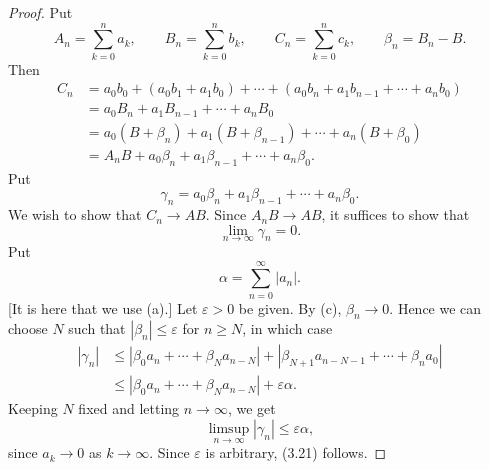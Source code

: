 \begin{proof}
Put
\[ A_n = \sum_{k=0}^{n} a_k, \qquad B_n = \sum_{k=0}^{n} b_k, \qquad
   C_n = \sum_{k=0}^{n} c_k, \qquad \beta_n = B_n - B. \]
Then
\begin{align*}
  C_n &= a_0b_0 + (a_0b_1+a_1b_0) + \cdots + (a_0b_n+a_1b_{n-1}+\cdots+a_nb_0)\\
      &= a_0B_n + a_1B_{n-1} + \cdots + a_nB_0\\
      &= a_0(B+\beta_n) + a_1(B+\beta_{n-1}) + \cdots + a_n(B+\beta_0)\\
      &= A_nB + a_0\beta_n + a_1\beta_{n-1} + \cdots + a_n\beta_0.
\end{align*}
Put
\[ \gamma_n = a_0\beta_n + a_1\beta_{n-1} + \cdots + a_n\beta_0. \]
We wish to show that $C_n \to AB$. Since $A_nB \to AB$, it suffices to show
that
\begin{equation}
  \lim_{n\to\infty} \gamma_n = 0. \tag{3.21}
\end{equation}
Put
\[ \alpha = \sum_{n=0}^{\infty} |a_n|. \]
[It is here that we use (a).] Let $\varepsilon > 0$ be given. By (c),
$\beta_n \to 0$. Hence we can choose $N$ such that $|\beta_n| \le \varepsilon$
for $n \ge N$, in which case
\begin{align*}
  |\gamma_n| &\le |\beta_0a_n + \cdots + \beta_Na_{n-N}|
              + |\beta_{N+1}a_{n-N-1} + \cdots + \beta_na_0|\\
             &\le |\beta_0a_n + \cdots + \beta_Na_{n-N}| + \varepsilon\alpha.
\end{align*}
Keeping $N$ fixed and letting $n \to \infty$, we get
\[ \limsup_{n\to\infty} |\gamma_n| \le \varepsilon\alpha, \]
since $a_k \to 0$ as $k \to \infty$. Since $\varepsilon$ is arbitrary, (3.21)
follows.
\end{proof}

